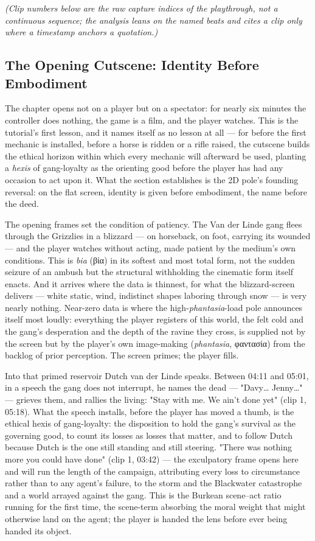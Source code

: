 \documentclass{article}
\newcommand{\gk}[1]{{\greekfont #1}}
\begin{document}
\textit{(Clip numbers below are the raw capture indices of the playthrough, not a continuous sequence; the analysis leans on the named beats and cites a clip only where a timestamp anchors a quotation.)}

\bigskip

\subsection*{The Opening Cutscene: Identity Before Embodiment}

The chapter opens not on a player but on a spectator: for nearly six minutes the controller does nothing, the game is a film, and the player watches. This is the tutorial's first lesson, and it names itself as no lesson at all — for before the first mechanic is installed, before a horse is ridden or a rifle raised, the cutscene builds the ethical horizon within which every mechanic will afterward be used, planting a \textit{hexis} of gang-loyalty as the orienting good before the player has had any occasion to act upon it. What the section establishes is the 2D pole's founding reversal: on the flat screen, identity is given before embodiment, the name before the deed.

The opening frames set the condition of patiency. The Van der Linde gang flees through the Grizzlies in a blizzard — on horseback, on foot, carrying its wounded — and the player watches without acting, made patient by the medium's own conditions. This is \textit{bia} (\gk{βία}) in its softest and most total form, not the sudden seizure of an ambush but the structural withholding the cinematic form itself enacts. And it arrives where the data is thinnest, for what the blizzard-screen delivers — white static, wind, indistinct shapes laboring through snow — is very nearly nothing. Near-zero data is where the high-\textit{phantasia}-load pole announces itself most loudly: everything the player registers of this world, the felt cold and the gang's desperation and the depth of the ravine they cross, is supplied not by the screen but by the player's own image-making (\textit{phantasia}, \gk{φαντασία}) from the backlog of prior perception. The screen primes; the player fills.

Into that primed reservoir Dutch van der Linde speaks. Between 04:11 and 05:01, in a speech the gang does not interrupt, he names the dead — "Davy… Jenny…" — grieves them, and rallies the living: "Stay with me. We ain't done yet" (clip 1, 05:18). What the speech installs, before the player has moved a thumb, is the ethical hexis of gang-loyalty: the disposition to hold the gang's survival as the governing good, to count its losses as losses that matter, and to follow Dutch because Dutch is the one still standing and still steering. "There was nothing more you could have done" (clip 1, 03:42) — the exculpatory frame opens here and will run the length of the campaign, attributing every loss to circumstance rather than to any agent's failure, to the storm and the Blackwater catastrophe and a world arrayed against the gang. This is the Burkean scene–act ratio running for the first time, the scene-term absorbing the moral weight that might otherwise land on the agent; the player is handed the lens before ever being handed its object.
\end{document}
